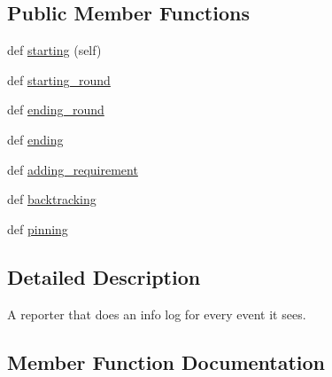 \subsection*{Public Member Functions}
\begin{DoxyCompactItemize}
\item 
def \hyperlink{classpip_1_1__internal_1_1resolution_1_1resolvelib_1_1reporter_1_1PipDebuggingReporter_a58949cfaab3502ae42bc34399e4225a1}{starting} (self)
\item 
def \hyperlink{classpip_1_1__internal_1_1resolution_1_1resolvelib_1_1reporter_1_1PipDebuggingReporter_a0c938a4521526180af8fb2bc92b0e745}{starting\+\_\+round}
\item 
def \hyperlink{classpip_1_1__internal_1_1resolution_1_1resolvelib_1_1reporter_1_1PipDebuggingReporter_a261434781a504abeeb670309924498b8}{ending\+\_\+round}
\item 
def \hyperlink{classpip_1_1__internal_1_1resolution_1_1resolvelib_1_1reporter_1_1PipDebuggingReporter_ad306ae5d2a8c8fc831115278882f573f}{ending}
\item 
def \hyperlink{classpip_1_1__internal_1_1resolution_1_1resolvelib_1_1reporter_1_1PipDebuggingReporter_ae0f2f2cd14c6b0559965521216dbfba2}{adding\+\_\+requirement}
\item 
def \hyperlink{classpip_1_1__internal_1_1resolution_1_1resolvelib_1_1reporter_1_1PipDebuggingReporter_afe78b379b4c4058605759dcf12ed0fa4}{backtracking}
\item 
def \hyperlink{classpip_1_1__internal_1_1resolution_1_1resolvelib_1_1reporter_1_1PipDebuggingReporter_a33c3ca2d7ec7dd14ccbade048c341975}{pinning}
\end{DoxyCompactItemize}


\subsection{Detailed Description}
\begin{DoxyVerb}A reporter that does an info log for every event it sees.\end{DoxyVerb}
 

\subsection{Member Function Documentation}
\mbox{\label{classpip_1_1__internal_1_1resolution_1_1resolvelib_1_1reporter_1_1PipDebuggingReporter_ae0f2f2cd14c6b0559965521216dbfba2}} 
